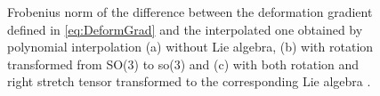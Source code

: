 \documentclass[12pt]{article}
\begin{document}
\begin{figure}[htbp]
  \begin{center}
    \unitlength=1.0mm
    \caption{Frobenius norm of the difference between the deformation
      gradient defined in \eqref{eq:DeformGrad} and the interpolated
      one obtained by polynomial interpolation (a) without Lie
      algebra, (b) with rotation transformed from SO(3) to so(3) and
      (c) with both rotation and right stretch tensor transformed to
      the corresponding Lie algebra .}
    \label{fig:ExampleRing}
  \end{center}
\end{figure}
\end{document}

